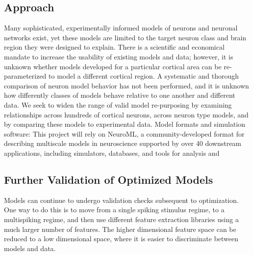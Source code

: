 \subsection{Approach}
Many sophisticated, experimentally informed models of neurons and neuronal networks exist, yet these models are limited to the target neuron class and brain region they were designed to explain. There is a scientific and economical mandate to increase the usability of existing models and data; however, it is unknown whether models developed for a particular cortical area can be re-parameterized to model a different cortical region. A systematic and thorough comparison of neuron model behavior has not been performed, and it is unknown how differently classes of models behave relative to one another and different data. We seek to widen the range of valid model re-purposing by examining relationships across hundreds of cortical neurons, across neuron type models, and by comparing these models to experimental data.\newline
\newline
Model formats and simulation software: This project will rely on NeuroML, a community-developed format for describing multiscale models in neuroscience supported by over 40 downstream applications, including simulators, databases, and tools for analysis and 

\subsection{Further Validation of Optimized Models}
Models can continue to undergo validation checks subsequent to optimization. One way to do this is to move from a single spiking stimulus regime, to a multispiking regime, and then use different feature extraction libraries using a much larger number of features.  The higher dimensional feature space can be reduced to a low dimensional space, where it is easier to discriminate between models and data.


